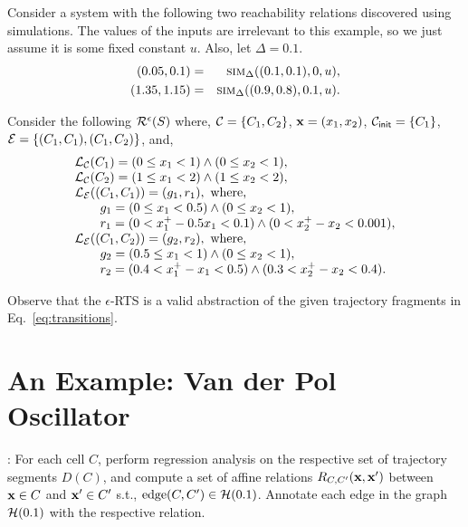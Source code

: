 \begin{example}
Consider a system with the following two reachability relations
discovered using simulations. The values of the inputs are irrelevant
to this example, so we just assume it is some fixed constant $u$.
Also, let $\Delta = 0.1$.
\begin{eqnarray}
\label{eq:transitions}
(0.05, 0.1) & = & \mbox{\sc sim}_\Delta((0.1, 0.1), 0, u), \\
(1.35,1.15) & = & \mbox{\sc sim}_\Delta((0.9, 0.8), 0.1, u).
\end{eqnarray}

Consider the following $\mathcal{R}^{\epsilon}(S)$ where,
$\mathcal{C} = \{C_1,C_2\}$, $\mathbf{x} = (x_1,x_2)$, $\mathcal{C}_{\mathsf{init}} = \{C_1\}$,
$\mathcal{E} = \{(C_1,C_1), (C_1, C_2)\}$, and,
\[
\begin{array}{l}
\mathcal{L}_\mathcal{C}(C_1) = (0 \le x_1 < 1) \wedge (0 \le x_2 < 1), \\
\mathcal{L}_\mathcal{C}(C_2) = (1 \le x_1 < 2) \wedge (1 \le x_2 < 2), \\
\mathcal{L}_\mathcal{E}((C_1,C_1)) = (g_1,r_1), \text{ where, } \\
\qquad g_1 = (0 \le x_1 < 0.5) \wedge (0 \le x_2 < 1), \\
\qquad r_1 = (0 < x^+_1 - 0.5x_1 < 0.1) \wedge (0 < x^+_2 - x_2 < 0.001), \\
\mathcal{L}_\mathcal{E}((C_1,C_2)) = (g_2,r_2), \text{ where, } \\
\qquad g_2 = (0.5 \le x_1 < 1) \wedge (0 \le x_2 < 1), \\
\qquad r_2 = (0.4 < x^+_1 - x_1 < 0.5) \wedge (0.3 < x^+_2 - x_2 < 0.4). \\
\end{array}
\]

Observe that the $\epsilon$-RTS is a valid abstraction of the given
trajectory fragments in Eq.~\ref{eq:transitions}.
\end{example}

\section{An Example: Van der Pol Oscillator}
: For each cell $C$, perform regression analysis on
    the respective set of trajectory segments $D(C)$, and compute a
    set of affine relations $R_{C,C'}(\mathbf{x},\mathbf{x}')$ between $\mathbf{x} \in C$ and $\mathbf{x}'
    \in C'$ s.t., $\text{edge} (C,C') \in \mathcal{H}(0.1)$. Annotate
    each edge in the graph $\mathcal{H}(0.1)$ with the respective
    relation.

